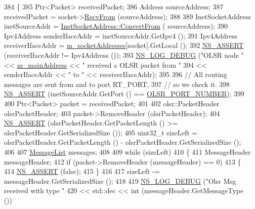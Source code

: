 \begin{DoxyCode}
384 \{
385   Ptr<Packet> receivedPacket;
386   Address sourceAddress;
387   receivedPacket = socket->\hyperlink{classns3_1_1Socket_af22378d7af9a2745a9eada20210da215}{RecvFrom} (sourceAddress);
388 
389   InetSocketAddress inetSourceAddr = \hyperlink{classns3_1_1InetSocketAddress_ade776b1109e7b9a7be0b22ced49931e3}{InetSocketAddress::ConvertFrom} (
      sourceAddress);
390   Ipv4Address senderIfaceAddr = inetSourceAddr.GetIpv4 ();
391   Ipv4Address receiverIfaceAddr = \hyperlink{classns3_1_1olsr_1_1RoutingProtocol_ae590f1f394f2ebc0fac434a6866d7c75}{m\_socketAddresses}[socket].GetLocal ();
392   \hyperlink{assert_8h_a6dccdb0de9b252f60088ce281c49d052}{NS\_ASSERT} (receiverIfaceAddr != Ipv4Address ());
393   \hyperlink{group__logging_ga413f1886406d49f59a6a0a89b77b4d0a}{NS\_LOG\_DEBUG} (\textcolor{stringliteral}{"OLSR node "} << \hyperlink{classns3_1_1olsr_1_1RoutingProtocol_a58cc50ed5d1039aab603e90e318aabfb}{m\_mainAddress} << \textcolor{stringliteral}{" received a OLSR packet from "}
394                              << senderIfaceAddr << \textcolor{stringliteral}{" to "} << receiverIfaceAddr);
395 
396   \textcolor{comment}{// All routing messages are sent from and to port RT\_PORT,}
397   \textcolor{comment}{// so we check it.}
398   \hyperlink{assert_8h_a6dccdb0de9b252f60088ce281c49d052}{NS\_ASSERT} (inetSourceAddr.GetPort () == \hyperlink{olsr-routing-protocol_8cc_a56099fb2a14f4a74c5e155c13e9ef8db}{OLSR\_PORT\_NUMBER});
399 
400   Ptr<Packet> packet = receivedPacket;
401 
402   olsr::PacketHeader olsrPacketHeader;
403   packet->RemoveHeader (olsrPacketHeader);
404   \hyperlink{assert_8h_a6dccdb0de9b252f60088ce281c49d052}{NS\_ASSERT} (olsrPacketHeader.GetPacketLength () >= olsrPacketHeader.GetSerializedSize ());
405   uint32\_t sizeLeft = olsrPacketHeader.GetPacketLength () - olsrPacketHeader.GetSerializedSize ();
406 
407   \hyperlink{namespacens3_1_1olsr_af17c710718a5637d01f37804a0a53e78}{MessageList} messages;
408 
409   \textcolor{keywordflow}{while} (sizeLeft)
410     \{
411       MessageHeader messageHeader;
412       \textcolor{keywordflow}{if} (packet->RemoveHeader (messageHeader) == 0)
413         \{
414           \hyperlink{assert_8h_a6dccdb0de9b252f60088ce281c49d052}{NS\_ASSERT} (\textcolor{keyword}{false});
415         \}
416 
417       sizeLeft -= messageHeader.GetSerializedSize ();
418 
419       \hyperlink{group__logging_ga413f1886406d49f59a6a0a89b77b4d0a}{NS\_LOG\_DEBUG} (\textcolor{stringliteral}{"Olsr Msg received with type "}
420                     << std::dec << \textcolor{keywordtype}{int} (messageHeader.GetMessageType ())

\end{DoxyCode}
